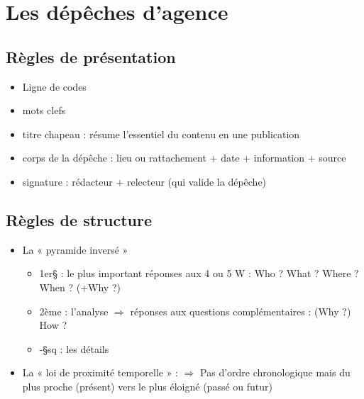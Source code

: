 \documentclass[a4paper,11pt]{report}
\begin{document}
\chapter{Les dépêches d'agence}
\section{Règles de présentation}
\begin{itemize}
    \item Ligne de codes
    \item mots clefs
    \item  titre chapeau : résume l’essentiel du contenu en une publication
    \item corps de la dépêche : lieu ou rattachement + date + information + source
    \item signature : rédacteur + relecteur (qui valide la dépêche)
\end{itemize}
 
\section{Règles de structure}
\begin{itemize}
    \item La « pyramide inversé » 
    \begin{itemize}
        \item 1er§ : le plus important  réponses aux 4 ou 5 W : Who ? What ? Where ? When ? (+Why ?)
        \item 2ème : l’analyse $\Rightarrow$ réponses aux questions complémentaires : (Why ?) How ?
        \item -§sq : les détails
    \end{itemize}
   \item La « loi de proximité temporelle » : $\Rightarrow$ Pas d’ordre chronologique mais du plus proche (présent) vers le plus éloigné (passé ou futur)
\end{itemize}
\end{document}
